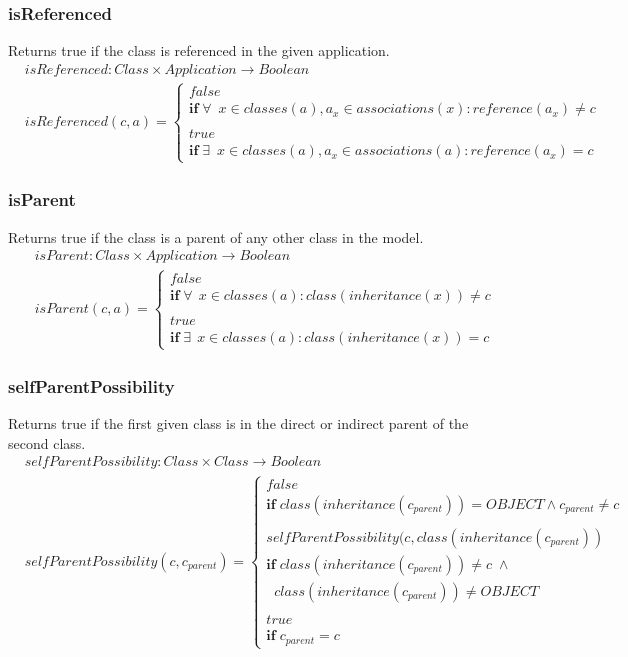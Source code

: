 \documentclass[10pt]{article}
\begin{document}
\subsubsection{isReferenced}
Returns true if the class is referenced in the given application.
\begin{align}
& isReferenced: Class \times Application \rightarrow Boolean \\
& isReferenced(c, a) = \begin{cases}
 false \\
 \mathbf{if} \; \forall \: \; x \in classes(a), a_x \in associations(x) : reference(a_x) \neq c \\ \\
 true \\
 \mathbf{if} \; \exists \:  \; x \in classes(a), a_x \in associations(a) : reference(a_x) = c 
 \end{cases}
\end{align}

\subsubsection{isParent}
Returns true if the class is a parent of any other class in the model.
\begin{align}
& isParent: Class \times Application \rightarrow Boolean \\
& isParent(c, a) = \begin{cases}
 false \\
 \mathbf{if} \; \forall \: \: x \in classes(a) : class(inheritance(x)) \neq c \\\\
 true \\
  \mathbf{if} \; \exists \:  \: x \in classes(a) : class(inheritance(x)) = c
 \end{cases}
\end{align}

\subsubsection{selfParentPossibility}
Returns true if the first given class is in the direct or indirect parent of the second class. 
\begin{align}
& selfParentPossibility: Class \times  Class \rightarrow Boolean \\
& selfParentPossibility(c, c_{parent}) = \begin{cases}
 false \\
 \mathbf{if} \; class(inheritance(c_{parent})) = OBJECT \land c_{parent} \neq c \\\\
 selfParentPossibility(c, class(inheritance(c_{parent}))\\
 \mathbf{if} \; class(inheritance(c_{parent})) \neq c \; \land  \\ \;\; class(inheritance(c_{parent})) \neq OBJECT \\\\
 true \\
 \mathbf{if} \; c_{parent} = c
 \end{cases}
\end{align}
\end{document}
